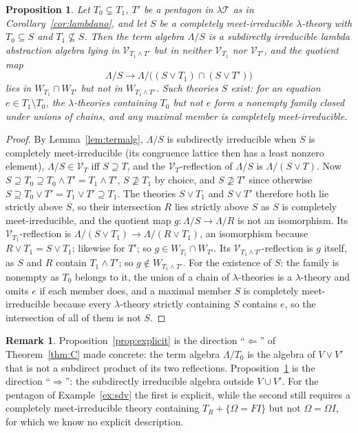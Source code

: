 \documentclass[11pt]{amsart}
\newtheorem{prop}[thm]{Proposition}
\theoremstyle{definition}
\newtheorem{rem}[thm]{Remark}
\newcommand{\sV}{\mathcal V}
\newcommand{\lT}{\lambda\mathcal T}
\begin{document}
\begin{prop}\label{prop:witness}
Let $T_0\subsetneq T_1$, $T'$ be a pentagon in $\lT$ as in
Corollary~\ref{cor:lambdano}, and let $S$ be a completely meet-irreducible
$\lambda$-theory with $T_0\subseteq S$ and $T_1\not\subseteq S$. Then the term
algebra $\Lambda/S$ is a subdirectly irreducible lambda abstraction algebra
lying in $\sV_{T_1\wedge T'}$ but in neither $\sV_{T_1}$ nor $\sV_{T'}$, and
the quotient map
\[
\Lambda/S\longrightarrow\Lambda/\bigl((S\vee T_1)\cap(S\vee T')\bigr)
\]
lies in $W_{T_1}\cap W_{T'}$ but not in $W_{T_1\wedge T'}$. Such theories $S$
exist: for an equation $e\in T_1\setminus T_0$, the $\lambda$-theories
containing $T_0$ but not $e$ form a nonempty family closed under unions of
chains, and any maximal member is completely meet-irreducible.
\end{prop}
\begin{proof}
By Lemma~\ref{lem:termalg}, $\Lambda/S$ is subdirectly irreducible when $S$
is completely meet-irreducible (its congruence lattice then has a least
nonzero element), $\Lambda/S\in\sV_T$ iff $S\supseteq T$, and the
$\sV_T$-reflection of $\Lambda/S$ is $\Lambda/(S\vee T)$. Now
$S\supseteq T_0\supseteq T_0\wedge T'=T_1\wedge T'$, $S\not\supseteq T_1$ by
choice, and $S\not\supseteq T'$ since otherwise
$S\supseteq T_0\vee T'=T_1\vee T'\supseteq T_1$. The theories $S\vee T_1$ and
$S\vee T'$ therefore both lie strictly above $S$, so their intersection $R$
lies strictly above $S$ as $S$ is completely meet-irreducible, and the
quotient map $g\colon\Lambda/S\to\Lambda/R$ is not an isomorphism. Its
$\sV_{T_1}$-reflection is $\Lambda/(S\vee T_1)\to\Lambda/(R\vee T_1)$, an
isomorphism because $R\vee T_1=S\vee T_1$; likewise for $T'$; so
$g\in W_{T_1}\cap W_{T'}$. Its $\sV_{T_1\wedge T'}$-reflection is $g$ itself,
as $S$ and $R$ contain $T_1\wedge T'$; so $g\notin W_{T_1\wedge T'}$.
For the existence of $S$: the family is nonempty as $T_0$ belongs to it, the
union of a chain of $\lambda$-theories is a $\lambda$-theory and omits $e$ if
each member does, and a maximal member $S$ is completely meet-irreducible
because every $\lambda$-theory strictly containing $S$ contains $e$, so the
intersection of all of them is not $S$.
\end{proof}

\begin{rem}
Proposition~\ref{prop:explicit} is the direction ``$\Leftarrow$'' of
Theorem~\ref{thm:C} made concrete: the term algebra $\Lambda/T_0$ is the
algebra of $V\vee V'$ that is not a subdirect product of its two reflections.
Proposition~\ref{prop:witness} is the direction ``$\Rightarrow$'': the
subdirectly irreducible algebra outside $V\cup V'$. For the pentagon of
Example~\ref{ex:sdv} the first is explicit, while the second still requires a
completely meet-irreducible theory containing $T_R+\{\Omega=FI\}$ but not
$\Omega=\Omega I$, for which we know no explicit description.
\end{rem}
\end{document}
